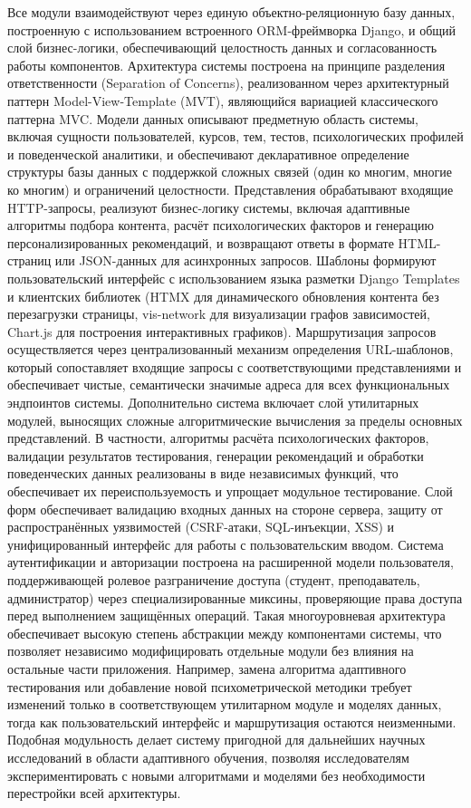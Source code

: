 Все модули взаимодействуют через единую объектно-реляционную базу данных, построенную с использованием встроенного ORM-фреймворка Django, и общий слой бизнес-логики, обеспечивающий целостность данных и согласованность работы компонентов. Архитектура системы построена на принципе разделения ответственности (Separation of Concerns), реализованном через архитектурный паттерн Model-View-Template (MVT), являющийся вариацией классического паттерна MVC. Модели данных описывают предметную область системы, включая сущности пользователей, курсов, тем, тестов, психологических профилей и поведенческой аналитики, и обеспечивают декларативное определение структуры базы данных с поддержкой сложных связей (один ко многим, многие ко многим) и ограничений целостности. Представления обрабатывают входящие HTTP-запросы, реализуют бизнес-логику системы, включая адаптивные алгоритмы подбора контента, расчёт психологических факторов и генерацию персонализированных рекомендаций, и возвращают ответы в формате HTML-страниц или JSON-данных для асинхронных запросов. Шаблоны формируют пользовательский интерфейс с использованием языка разметки Django Templates и клиентских библиотек (HTMX для динамического обновления контента без перезагрузки страницы, vis-network для визуализации графов зависимостей, Chart.js для построения интерактивных графиков). Маршрутизация запросов осуществляется через централизованный механизм определения URL-шаблонов, который сопоставляет входящие запросы с соответствующими представлениями и обеспечивает чистые, семантически значимые адреса для всех функциональных эндпоинтов системы.
Дополнительно система включает слой утилитарных модулей, выносящих сложные алгоритмические вычисления за пределы основных представлений. В частности, алгоритмы расчёта психологических факторов, валидации результатов тестирования, генерации рекомендаций и обработки поведенческих данных реализованы в виде независимых функций, что обеспечивает их переиспользуемость и упрощает модульное тестирование. Слой форм обеспечивает валидацию входных данных на стороне сервера, защиту от распространённых уязвимостей (CSRF-атаки, SQL-инъекции, XSS) и унифицированный интерфейс для работы с пользовательским вводом. Система аутентификации и авторизации построена на расширенной модели пользователя, поддерживающей ролевое разграничение доступа (студент, преподаватель, администратор) через специализированные миксины, проверяющие права доступа перед выполнением защищённых операций.
Такая многоуровневая архитектура обеспечивает высокую степень абстракции между компонентами системы, что позволяет независимо модифицировать отдельные модули без влияния на остальные части приложения. Например, замена алгоритма адаптивного тестирования или добавление новой психометрической методики требует изменений только в соответствующем утилитарном модуле и моделях данных, тогда как пользовательский интерфейс и маршрутизация остаются неизменными. Подобная модульность делает систему пригодной для дальнейших научных исследований в области адаптивного обучения, позволяя исследователям экспериментировать с новыми алгоритмами и моделями без необходимости перестройки всей архитектуры.
